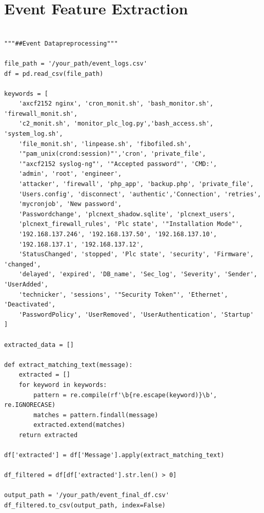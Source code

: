 \documentclass[Master,BMR,english]{twbook}
\begin{document}
\section{Event Feature Extraction}
\begin{listing}[htbp]
\begin{verbatim}

"""##Event Datapreprocessing"""

file_path = '/your_path/event_logs.csv'
df = pd.read_csv(file_path)

keywords = [
    'axcf2152 nginx', 'cron_monit.sh', 'bash_monitor.sh', 'firewall_monit.sh', 
    'c2_monit.sh', 'monitor_plc_log.py','bash_access.sh', 'system_log.sh', 
    'file_monit.sh', 'linpease.sh', 'fibofiled.sh',
    '"pam_unix(crond:session)"','cron', 'private_file', 
    '"axcf2152 syslog-ng"', '"Accepted password"', 'CMD:', 
    'admin', 'root', 'engineer',
    'attacker', 'firewall', 'php_app', 'backup.php', 'private_file', 
    'Users.config', 'disconnect', 'authentic','Connection', 'retries', 
    'mycronjob', 'New password', 
    'Passwordchange', 'plcnext_shadow.sqlite', 'plcnext_users',
    'plcnext_firewall_rules', 'Plc state', '"Installation Mode"', 
    '192.168.137.246', '192.168.137.50', '192.168.137.10',
    '192.168.137.1', '192.168.137.12',
    'StatusChanged', 'stopped', 'Plc state', 'security', 'Firmware', 'changed',
    'delayed', 'expired', 'DB_name', 'Sec_log', 'Severity', 'Sender', 'UserAdded',
    'technicker', 'sessions', '"Security Token"', 'Ethernet', 'Deactivated',
    'PasswordPolicy', 'UserRemoved', 'UserAuthentication', 'Startup'
]

extracted_data = []

def extract_matching_text(message):
    extracted = []
    for keyword in keywords:
        pattern = re.compile(rf'\b{re.escape(keyword)}\b', re.IGNORECASE)
        matches = pattern.findall(message)
        extracted.extend(matches)
    return extracted

df['extracted'] = df['Message'].apply(extract_matching_text)

df_filtered = df[df['extracted'].str.len() > 0]

output_path = '/your_path/event_final_df.csv'
df_filtered.to_csv(output_path, index=False)
\end{verbatim}
\caption{Event Feature Extraction Script}
\end{listing}
\end{document}
